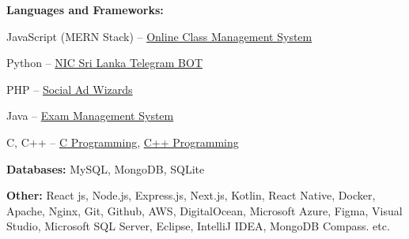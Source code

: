 
\begin{onecolentry}
   \textbf{Languages and Frameworks:}
   \begin{highlights}
      \item JavaScript (MERN Stack) -- {\href{https://github.com/ShanelkaPramuditha/online-class-management-system}{\textcolor{secondaryColor}{Online Class Management System}}}
      \item Python -- {\href{https://github.com/ShanelkaPramuditha/NIC-Sri-Lanka-BOT}{\textcolor{secondaryColor}{NIC Sri Lanka Telegram BOT}}}
      \item PHP -- {\href{https://github.com/ShanelkaPramuditha/IWT-Project-Social-Ad-Wizards}{\textcolor{secondaryColor}{Social Ad Wizards}}}
      \item Java -- {\href{https://github.com/ShanelkaPramuditha/oop-project-ems-portal}{\textcolor{secondaryColor}{Exam Management System}}}
      \item C, C++ -- {\href{https://github.com/ShanelkaPramuditha/C-programming}{\textcolor{secondaryColor}{C Programming}}}, {\href{https://github.com/ShanelkaPramuditha/Cpp-programming}{\textcolor{secondaryColor}{C++ Programming}}}
   \end{highlights}
\end{onecolentry}

\vspace{0.2 cm}

\begin{onecolentry}
   \textbf{Databases:} MySQL, MongoDB, SQLite
\end{onecolentry}

\vspace{0.2 cm}

\begin{onecolentry}
   \textbf{Other:} React js, Node.js, Express.js, Next.js, Kotlin, React Native, Docker, Apache, Nginx, Git, Github, AWS, DigitalOcean, Microsoft Azure, Figma, Visual Studio, Microsoft SQL Server, Eclipse, IntelliJ IDEA, MongoDB Compass. etc.
\end{onecolentry}